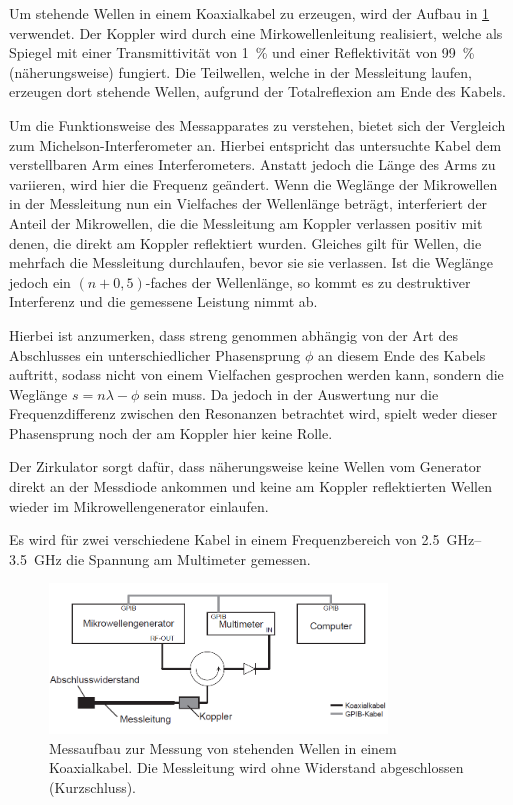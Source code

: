 \documentclass[
	a4paper,
	12pt,
	pagesize,
	ngerman
]{scrartcl}
\begin{document}
	Um stehende Wellen in einem Koaxialkabel zu erzeugen, wird der Aufbau in \cref{fig_aufbau_resonanzen} verwendet.
	Der Koppler wird durch eine Mirkowellenleitung realisiert, welche als Spiegel mit einer Transmittivität von \SI{1}{\percent} und einer Reflektivität von \SI{99}{\percent} (näherungsweise) fungiert.
	Die Teilwellen, welche in der Messleitung laufen, erzeugen dort stehende Wellen, aufgrund der Totalreflexion am Ende des Kabels.

	Um die Funktionsweise des Messapparates zu verstehen, bietet sich der Vergleich zum Michelson-Interferometer an.
	Hierbei entspricht das untersuchte Kabel dem verstellbaren Arm eines Interferometers.
	Anstatt jedoch die Länge des Arms zu variieren, wird hier die Frequenz geändert.
	Wenn die Weglänge der Mikrowellen in der Messleitung nun ein Vielfaches der Wellenlänge beträgt, interferiert der Anteil der Mikrowellen, die die Messleitung am Koppler verlassen positiv mit denen, die direkt am Koppler reflektiert wurden.
	Gleiches gilt für Wellen, die mehrfach die Messleitung durchlaufen, bevor sie sie verlassen.
	Ist die Weglänge jedoch ein $(n+0,5)$-faches der Wellenlänge, so kommt es zu destruktiver Interferenz und die gemessene Leistung nimmt ab.

	Hierbei ist anzumerken, dass streng genommen abhängig von der Art des Abschlusses ein unterschiedlicher Phasensprung $\phi$ an diesem Ende des Kabels auftritt, sodass nicht von einem Vielfachen gesprochen werden kann, sondern die Weglänge $s = n\lambda - \phi$ sein muss.
	Da jedoch in der Auswertung nur die Frequenzdifferenz zwischen den Resonanzen betrachtet wird, spielt weder dieser Phasensprung noch der am Koppler hier keine Rolle.

	Der Zirkulator sorgt dafür, dass näherungsweise keine Wellen vom Generator direkt an der Messdiode ankommen und keine am Koppler reflektierten Wellen wieder im Mikrowellengenerator einlaufen.

	Es wird für zwei verschiedene Kabel in einem Frequenzbereich von \SIrange{2,5}{3,5}{\giga \hertz} die Spannung am Multimeter gemessen.

	\begin{figure}[H]
		\includegraphics[width=0.8\textwidth]{img/aufbau_resonanzen.png}
		\centering
		\caption{
		 	Messaufbau zur Messung von stehenden Wellen in einem Koaxialkabel. Die Messleitung wird ohne Widerstand abgeschlossen (Kurzschluss). \cite{Anleitung}
		}
		\label{fig_aufbau_resonanzen}
		\centering
	\end{figure}
\end{document}
